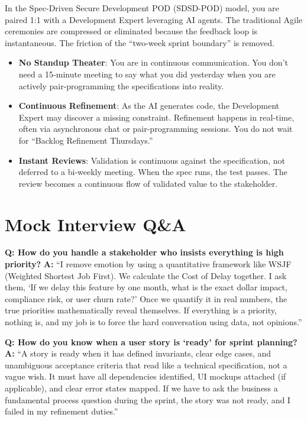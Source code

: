 In the Spec-Driven Secure Development POD (SDSD-POD) model, you are
paired 1:1 with a Development Expert leveraging AI agents. The
traditional Agile ceremonies are compressed or eliminated because the
feedback loop is instantaneous. The friction of the ``two-week sprint
boundary'' is removed.

\begin{itemize}
\tightlist
\item
  \textbf{No Standup Theater}: You are in continuous communication. You
  don't need a 15-minute meeting to say what you did yesterday when you
  are actively pair-programming the specifications into reality.
\item
  \textbf{Continuous Refinement}: As the AI generates code, the
  Development Expert may discover a missing constraint. Refinement
  happens in real-time, often via asynchronous chat or pair-programming
  sessions. You do not wait for ``Backlog Refinement Thursdays.''
\item
  \textbf{Instant Reviews}: Validation is continuous against the
  specification, not deferred to a bi-weekly meeting. When the spec
  runs, the test passes. The review becomes a continuous flow of
  validated value to the stakeholder.
\end{itemize}

\section{Mock Interview Q\&A}\label{mock-interview-qa}

\textbf{Q: How do you handle a stakeholder who insists everything is
high priority?} \textbf{A:} ``I remove emotion by using a quantitative
framework like WSJF (Weighted Shortest Job First). We calculate the Cost
of Delay together. I ask them, `If we delay this feature by one month,
what is the exact dollar impact, compliance risk, or user churn rate?'
Once we quantify it in real numbers, the true priorities mathematically
reveal themselves. If everything is a priority, nothing is, and my job
is to force the hard conversation using data, not opinions.''

\textbf{Q: How do you know when a user story is `ready' for sprint
planning?} \textbf{A:} ``A story is ready when it has defined
invariants, clear edge cases, and unambiguous acceptance criteria that
read like a technical specification, not a vague wish. It must have all
dependencies identified, UI mockups attached (if applicable), and clear
error states mapped. If we have to ask the business a fundamental
process question during the sprint, the story was not ready, and I
failed in my refinement duties.''

